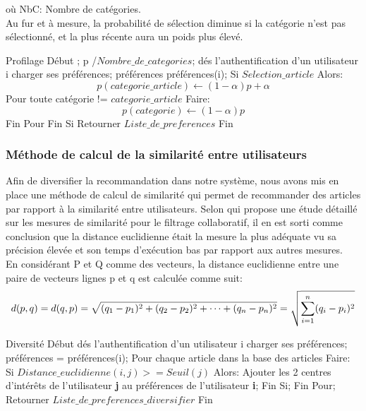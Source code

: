 où NbC: Nombre de catégories.\\
Au fur et à mesure, la probabilité de sélection diminue si la catégorie n'est pas sélectionné, et la plus récente aura un poids plus élevé. 
 \begin{algorithm}
	\begin{algorithmic}[1]
		\STATE Profilage
		\STATE Début
		\STATE \alpha {};
		\STATE p /$Nombre\_de\_categories$;		
        \STATE dés l'authentification d'un utilisateur i charger ses préférences;
		\STATE préférences \gets préférences(i);	
		\STATE Si $Selection\_article$ Alors:
        \STATE \[p(categorie\_article) \gets (1-{\alpha}) {p} + {\alpha}\]
        \STATE Pour toute catégorie != $categorie\_article$ Faire:
		\STATE \[p(categorie) \gets (1-{\alpha}) {p} \]
        \STATE Fin Pour
		\STATE Fin Si
		\STATE \quad Retourner $Liste\_de\_preferences$	
        \STATE Fin
    \end{algorithmic}
\end{algorithm}
\subsubsection{Méthode de calcul de la similarité entre utilisateurs}
Afin de diversifier la recommandation dans notre système, nous avons mis en place une méthode de calcul de similarité qui permet de recommander des articles par rapport à la similarité entre utilisateurs. Selon \cite{euclidepreuve} qui propose une étude détaillé sur les mesures de similarité pour le filtrage collaboratif, il en est sorti comme conclusion que la distance euclidienne était la mesure la plus adéquate vu sa précision élevée et son temps d'exécution bas par rapport aux autres mesures.\\
En considérant P et Q comme des vecteurs, la distance euclidienne entre une paire de vecteurs lignes p et q est calculée comme suit:
            \[d({p} ,{q})=d({q} ,{p})={\sqrt {(q_{1}-p_{1})^{2}+(q_{2}-p_{2})^{2}+\cdots +(q_{n}-p_{n})^{2}}}\\
            ={\sqrt {\sum _{i=1}^{n}(q_{i}-p_{i})^{2}}}\]
\begin{algorithm}[H]
	\begin{algorithmic}[1]
        \STATE Diversité
        \STATE Début
		\STATE dés l'authentification d'un utilisateur i charger ses préférences;
		\STATE préférences = préférences(i);
		\STATE Pour chaque article dans la base des articles Faire:
        \STATE Si {$Distance\_euclidienne(i,j) >= Seuil(j)$} Alors:
        \STATE Ajouter les 2 centres d'intérêts de l'utilisateur \textbf{j} au préférences de l'utilisateur \textbf{i};
 		\STATE Fin Si;	
		\STATE Fin Pour;
		\STATE \quad Retourner $Liste\_de\_preferences\_diversifier$
		\STATE Fin
	\end{algorithmic}
\end{algorithm}

